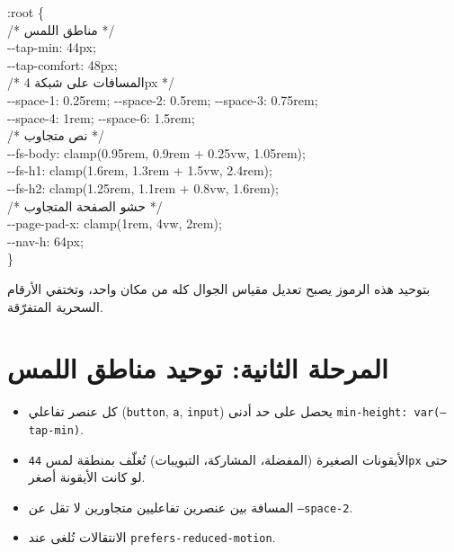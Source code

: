 \documentclass[11pt]{article}
\begin{document}
\begin{codebox}
{\ttfamily\small\raggedleft
:root \{\\
\quad /* مناطق اللمس */\\
\quad -{}-tap-min: 44px;\\
\quad -{}-tap-comfort: 48px;\\
\quad /* المسافات على شبكة 4px */\\
\quad -{}-space-1: 0.25rem; -{}-space-2: 0.5rem; -{}-space-3: 0.75rem;\\
\quad -{}-space-4: 1rem; -{}-space-6: 1.5rem;\\
\quad /* نص متجاوب */\\
\quad -{}-fs-body: clamp(0.95rem, 0.9rem + 0.25vw, 1.05rem);\\
\quad -{}-fs-h1: clamp(1.6rem, 1.3rem + 1.5vw, 2.4rem);\\
\quad -{}-fs-h2: clamp(1.25rem, 1.1rem + 0.8vw, 1.6rem);\\
\quad /* حشو الصفحة المتجاوب */\\
\quad -{}-page-pad-x: clamp(1rem, 4vw, 2rem);\\
\quad -{}-nav-h: 64px;\\
\}
}
\end{codebox}

\begin{goalbox}
بتوحيد هذه الرموز يصبح تعديل مقياس الجوال كله من مكان واحد، وتختفي الأرقام السحرية المتفرّقة.
\end{goalbox}

\section{المرحلة الثانية: توحيد مناطق اللمس}

\begin{itemize}
  \item كل عنصر تفاعلي (\texttt{button}, \texttt{a}, \texttt{input}) يحصل على حد أدنى \texttt{min-height: var(--tap-min)}.
  \item الأيقونات الصغيرة (المفضلة، المشاركة، التبويبات) تُغلّف بمنطقة لمس \texttt{44px} حتى لو كانت الأيقونة أصغر.
  \item المسافة بين عنصرين تفاعليين متجاورين لا تقل عن \texttt{--space-2}.
  \item الانتقالات تُلغى عند \texttt{prefers-reduced-motion}.
\end{itemize}

\end{document}
